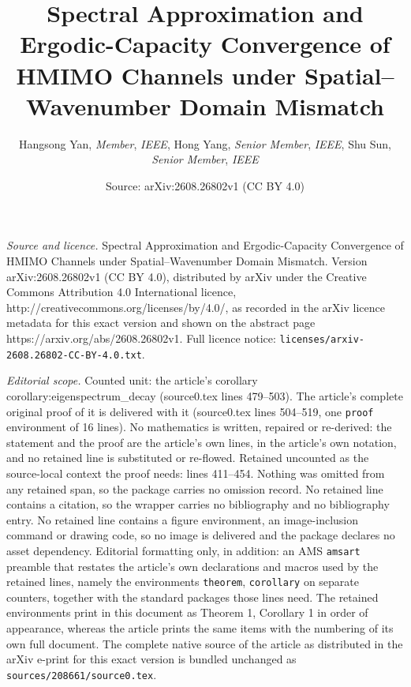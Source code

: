 \documentclass[10pt,a4paper]{amsart}
\title{Spectral Approximation and Ergodic-Capacity Convergence of HMIMO Channels under Spatial–Wavenumber Domain Mismatch}
\author{Hangsong Yan, \textit{Member}, \textit{IEEE}, Hong Yang, \textit{Senior Member}, \textit{IEEE}, Shu Sun, \textit{Senior Member}, \textit{IEEE}}
\date{Source: arXiv:2608.26802v1 (CC BY 4.0)}
\begin{document}
\maketitle

\noindent\emph{Source and licence.} Spectral Approximation and Ergodic-Capacity Convergence of HMIMO Channels under Spatial–Wavenumber Domain Mismatch. Version arXiv:2608.26802v1 (CC BY 4.0), distributed by arXiv under the Creative Commons Attribution 4.0 International licence, http://creativecommons.org/licenses/by/4.0/, as recorded in the arXiv licence metadata for this exact version and shown on the abstract page https://arxiv.org/abs/2608.26802v1. Full licence notice: \texttt{licenses/arxiv-2608.26802-CC-BY-4.0.txt}.\par\smallskip

\noindent\textit{Editorial scope.} Counted unit: the article's corollary corollary:eigenspectrum\_decay (source0.tex lines 479--503). The article's complete original proof of it is delivered with it (source0.tex lines 504--519, one \texttt{proof} environment of 16 lines). No mathematics is written, repaired or re-derived: the statement and the proof are the article's own lines, in the article's own notation, and no retained line is substituted or re-flowed.  Retained uncounted as the source-local context the proof needs: lines 411--454.  Nothing was omitted from any retained span, so the package carries no omission record.  No retained line contains a citation, so the wrapper carries no bibliography and no bibliography entry.  No retained line contains a figure environment, an image-inclusion command or drawing code, so no image is delivered and the package declares no asset dependency.  Editorial formatting only, in addition: an AMS \texttt{amsart} preamble that restates the article's own declarations and macros used by the retained lines, namely the environments \texttt{theorem}, \texttt{corollary} on separate counters, together with the standard packages those lines need.  The retained environments print in this document as Theorem 1, Corollary 1 in order of appearance, whereas the article prints the same items with the numbering of its own full document.  The complete native source of the article as distributed in the arXiv e-print for this exact version is bundled unchanged as \texttt{sources/208661/source0.tex}.
\end{document}

